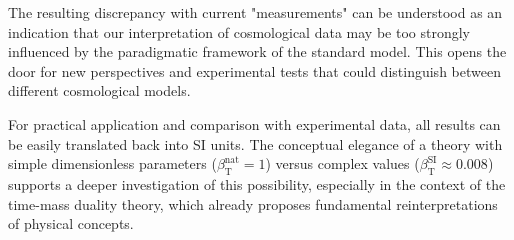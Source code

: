 \documentclass[12pt,a4paper]{article}
\newcommand{\betaT}{\beta_{\text{T}}}
\begin{document}
	The resulting discrepancy with current "measurements" can be understood as an indication that our interpretation of cosmological data may be too strongly influenced by the paradigmatic framework of the standard model. This opens the door for new perspectives and experimental tests that could distinguish between different cosmological models.
	
	For practical application and comparison with experimental data, all results can be easily translated back into SI units. The conceptual elegance of a theory with simple dimensionless parameters (\(\betaT^{\text{nat}} = 1\)) versus complex values (\(\betaT^{\text{SI}} \approx 0.008\)) supports a deeper investigation of this possibility, especially in the context of the time-mass duality theory, which already proposes fundamental reinterpretations of physical concepts.
	
\end{document}
